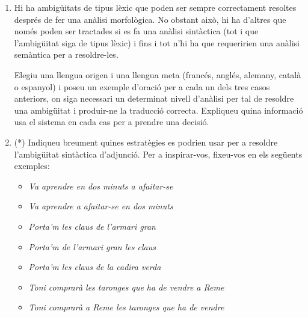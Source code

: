\begin{enumerate}
\begin{enumerate}

      \end{enumerate}

  \item Hi ha ambigüitats de tipus lèxic que poden ser sempre
    correctament resoltes després de fer una anàlisi morfològica. No
    obstant això, hi ha d'altres que només poden ser tractades si es
    fa una anàlisi sintàctica (tot i que l'ambigüitat siga de tipus
    lèxic) i fins i tot n'hi ha que requeririen una anàlisi semàntica
    per a resoldre-les.
    
    Elegiu una llengua origen i una llengua meta (francés, anglés,
    alemany, català o espanyol) i poseu un exemple d'oració per a cada
    un dels tres casos anteriors, on siga necessari un determinat
    nivell d'anàlisi per tal de resoldre una ambigüitat i produir-ne
    la traducció correcta. Expliqueu quina informació usa el sistema
    en cada cas per a prendre una decisió.


      
\item(*) Indiqueu breument quines estratègies es
      podrien usar per a resoldre l'ambigüitat sintàctica d'adjunció.
      Per a inspirar-vos, fixeu-vos en els següents exemples:
  \begin{itemize}
  \item \emph{Va aprendre en dos minuts a afaitar-se}
  \item \emph{Va aprendre a afaitar-se en dos minuts} 
  \item \emph{Porta'm les claus de l'armari gran}
  \item \emph{Porta'm de l'armari gran les claus}
  \item \emph{Porta'm les claus de la cadira verda}
  \item \emph{Toni comprarà les taronges que ha de vendre a Reme}
  \item \emph{Toni comprarà a Reme les taronges que ha de vendre} 
  \end{itemize}


\end{enumerate}
